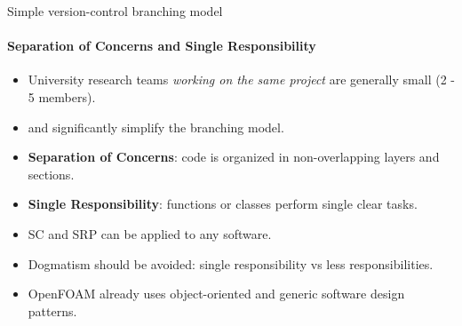\documentclass[
	aspectratio=169,%
	color={accentcolor=2d},
	logo=true,%
	colorframetitle=true,%
	]{tudabeamer}
\begin{document}
\begin{frame}{Simple version-control branching model} 
    \framesubtitle{Separation of Concerns and Single Responsibility}

	\vfill
	\begin{itemize}

            \item University research teams \emph{working on the same project} are generally small (2 - 5 members).
            \item \href{https://en.wikipedia.org/wiki/Separation_of_concerns}{} and \href{https://en.wikipedia.org/wiki/Single-responsibility_principle}{} significantly simplify the branching model. 

            \item \textbf{Separation of Concerns}: code is organized in non-overlapping layers and sections. 

            \item \textbf{Single Responsibility}: functions or classes perform single clear tasks.

            \item SC and SRP can be applied to any software.
            \item Dogmatism should be avoided: single responsibility vs less responsibilities. 
            \item OpenFOAM already uses object-oriented and generic software design patterns.  

        \end{itemize}
\end{frame}
\end{document}
